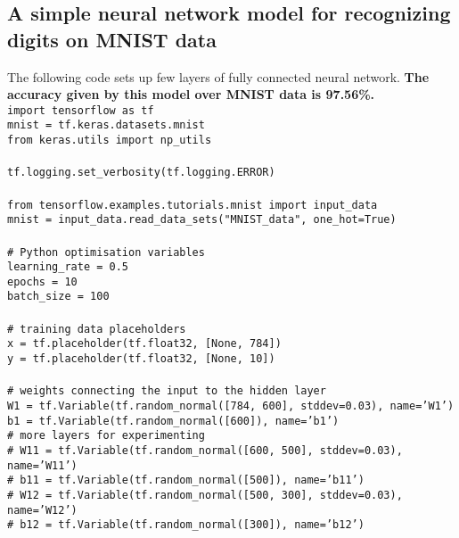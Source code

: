 \documentclass[letterpaper]{article}
\begin{document}
\begin{appendices}
	
\section{A simple neural network model for recognizing digits on MNIST data}

The following code sets up few layers of fully connected neural network. \textbf{The accuracy given by this model over MNIST data is 97.56\%.}\\

\noindent\texttt{import tensorflow as tf\\
mnist = tf.keras.datasets.mnist\\
from keras.utils import np\_utils\\\\
tf.logging.set\_verbosity(tf.logging.ERROR)\\\\
from tensorflow.examples.tutorials.mnist import input\_data\\
mnist = input\_data.read\_data\_sets("MNIST\_data", one\_hot=True)\\\\
\# Python optimisation variables\\
learning\_rate = 0.5\\
epochs = 10\\
batch\_size = 100\\\\
\# training data placeholders\\
x = tf.placeholder(tf.float32, [None, 784])\\
y = tf.placeholder(tf.float32, [None, 10])\\\\
\# weights connecting the input to the hidden layer\\
W1 = tf.Variable(tf.random\_normal([784, 600], stddev=0.03), name='W1')\\
b1 = tf.Variable(tf.random\_normal([600]), name='b1')\\
\# more layers for experimenting \\
\# W11 = tf.Variable(tf.random\_normal([600, 500], stddev=0.03), name='W11')\\
\# b11 = tf.Variable(tf.random\_normal([500]), name='b11')\\
\# W12 = tf.Variable(tf.random\_normal([500, 300], stddev=0.03), name='W12')\\
\# b12 = tf.Variable(tf.random\_normal([300]), name='b12')\\
}
\end{appendices}
\end{document}

